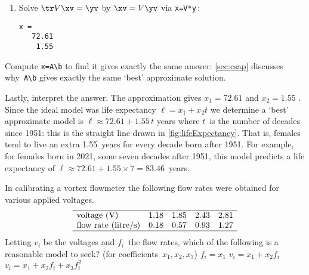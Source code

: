 \begin{example}
\begin{solution}
\begin{enumerate}
\item Solve \(\tr V\xv=\yv\) by \(\xv=V\yv\) via \verb|x=V*y|\,:
\begin{verbatim}
x =
   72.61
    1.55
\end{verbatim}
\end{enumerate}
Compute \verb|x=A\b| to find it gives exactly the same answer: \autoref{sec:csap} discusses why~\verb|A\b| gives exactly the same `best' approximate solution. 

Lastly, interpret the answer.
The approximation gives \(x_1=72.61\) and \(x_2=1.55\) \twodp.  
Since the ideal model was life expectancy \(\ell=x_1+x_2t\) we  determine a `best' approximate model is \(\ell\approx72.61+1.55\,t\) years where \(t\)~is the number of decades since 1951: this is the straight line drawn in \autoref{fig:lifeExpectancy}.
That is, females tend to live an extra 1.55~years for every decade born after 1951.
For example, for females born in 2021, some seven decades after 1951, this model predicts a life expectancy of \(\ell\approx72.61+1.55\times7=83.46\)~years.
\end{solution}
\end{example}



\begin{activity}\label{eg:flowmeter}
In calibrating a vortex flowmeter the following flow rates were obtained for various applied voltages.
\begin{equation*}
\begin{array}{lrrrr}\hline
\text{voltage (V)}&1.18&1.85&2.43&2.81\\
\text{flow rate (litre/s)}&0.18&0.57&0.93&1.27\\\hline
\end{array}
\end{equation*}
Letting \(v_i\) be the voltages and \(f_i\)~the flow rates, which of the following is a reasonable model to seek? (for coefficients~\(x_1,x_2,x_3\))
{\(f_i=x_1\)}
{\(v_i=x_1+x_2f_i\)}
{\(v_i=x_1+x_2f_i+x_3f_i^2\)}
\end{activity}



